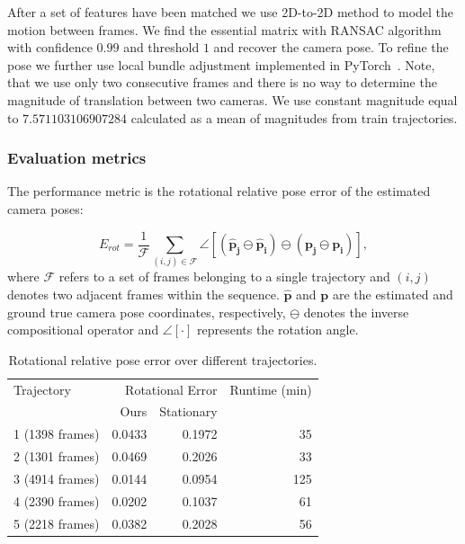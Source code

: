 \documentclass{article}
\begin{document}
After a set of features have been matched we use 2D-to-2D method to model the
motion between frames. We find the essential matrix with RANSAC algorithm with
confidence $0.99$ and threshold $1$ and recover the camera pose. To refine the
pose we further use local bundle adjustment implemented in
PyTorch~\cite{edstedt2023mba}. Note, that we use only two consecutive frames
and there is no way to determine the magnitude of translation between two
cameras. We use constant magnitude equal to $7.571103106907284$ calculated as a
mean of magnitudes from train trajectories.

\subsubsection{Evaluation metrics}

The performance metric is the rotational relative pose error of the estimated
camera poses:

\begin{equation}
    E_{rot}
    =\frac{1}{\mathcal{F}}
     \sum_{(i,j)\in\mathcal{F}}
     \angle
     \left[
         \left(\mathbf{\hat{p}_j} \ominus \mathbf{\hat{p}_i}\right)
         \ominus
         \left(\mathbf{p_j} \ominus \mathbf{p_i}\right)
     \right],
\end{equation}
where $\mathcal{F}$ refers to a set of frames belonging to a single trajectory
and $(i,j)$ denotes two adjacent frames within the sequence. $\mathbf{\hat{p}}$
and $\mathbf{p}$ are the estimated and ground true camera pose coordinates,
respectively, $\ominus$ denotes the inverse compositional operator and
$\angle[\cdot]$ represents the rotation angle.

\begin{table}
    \centering
    \begin{tabular}{lrrr}
        \toprule
        Trajectory & \multicolumn{2}{r}{Rotational Error} & Runtime (min) \\
        & Ours & Stationary & \\
        \midrule
        1 (1398 frames) & 0.0433 & 0.1972 & 35 \\
        2 (1301 frames) & 0.0469 & 0.2026 & 33 \\
        3 (4914 frames) & 0.0144 & 0.0954 & 125 \\
        4 (2390 frames) & 0.0202 & 0.1037 & 61 \\
        \midrule
        5 (2218 frames) & 0.0382 & 0.2028 & 56 \\
        \bottomrule
    \end{tabular}
    \caption{Rotational relative pose error over different trajectories.}
    \label{tab:metric}
\end{table}
\end{document}
